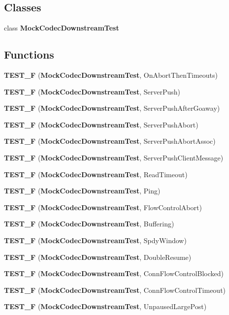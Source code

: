 \subsection*{Classes}
\begin{DoxyCompactItemize}
\item 
class {\bf Mock\+Codec\+Downstream\+Test}
\end{DoxyCompactItemize}
\subsection*{Functions}
\begin{DoxyCompactItemize}
\item 
{\bf T\+E\+S\+T\+\_\+F} ({\bf Mock\+Codec\+Downstream\+Test}, On\+Abort\+Then\+Timeouts)
\item 
{\bf T\+E\+S\+T\+\_\+F} ({\bf Mock\+Codec\+Downstream\+Test}, Server\+Push)
\item 
{\bf T\+E\+S\+T\+\_\+F} ({\bf Mock\+Codec\+Downstream\+Test}, Server\+Push\+After\+Goaway)
\item 
{\bf T\+E\+S\+T\+\_\+F} ({\bf Mock\+Codec\+Downstream\+Test}, Server\+Push\+Abort)
\item 
{\bf T\+E\+S\+T\+\_\+F} ({\bf Mock\+Codec\+Downstream\+Test}, Server\+Push\+Abort\+Assoc)
\item 
{\bf T\+E\+S\+T\+\_\+F} ({\bf Mock\+Codec\+Downstream\+Test}, Server\+Push\+Client\+Message)
\item 
{\bf T\+E\+S\+T\+\_\+F} ({\bf Mock\+Codec\+Downstream\+Test}, Read\+Timeout)
\item 
{\bf T\+E\+S\+T\+\_\+F} ({\bf Mock\+Codec\+Downstream\+Test}, Ping)
\item 
{\bf T\+E\+S\+T\+\_\+F} ({\bf Mock\+Codec\+Downstream\+Test}, Flow\+Control\+Abort)
\item 
{\bf T\+E\+S\+T\+\_\+F} ({\bf Mock\+Codec\+Downstream\+Test}, Buffering)
\item 
{\bf T\+E\+S\+T\+\_\+F} ({\bf Mock\+Codec\+Downstream\+Test}, Spdy\+Window)
\item 
{\bf T\+E\+S\+T\+\_\+F} ({\bf Mock\+Codec\+Downstream\+Test}, Double\+Resume)
\item 
{\bf T\+E\+S\+T\+\_\+F} ({\bf Mock\+Codec\+Downstream\+Test}, Conn\+Flow\+Control\+Blocked)
\item 
{\bf T\+E\+S\+T\+\_\+F} ({\bf Mock\+Codec\+Downstream\+Test}, Conn\+Flow\+Control\+Timeout)
\item 
{\bf T\+E\+S\+T\+\_\+F} ({\bf Mock\+Codec\+Downstream\+Test}, Unpaused\+Large\+Post)

\end{DoxyCompactItemize}
